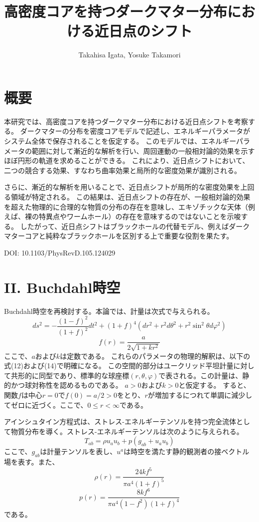 \documentclass[dvipdfmx]{report} %
\title{高密度コアを持つダークマター分布における近日点のシフト}
\author{Takahisa Igata, Yosuke Takamori}
\date{}
\begin{document}
\maketitle %

\section*{概要}
本研究では、高密度コアを持つダークマター分布における近日点シフトを考察する。
ダークマターの分布を密度コアモデルで記述し、エネルギーパラメータがシステム全体で保存されることを仮定する。
このモデルでは、エネルギーパラメータの範囲に対して漸近的な解析を行い、周回運動の一般相対論的効果を示すほぼ円形の軌道を求めることができる。
これにより、近日点シフトにおいて、二つの競合する効果、すなわち曲率効果と局所的な密度効果が識別される。

さらに、漸近的な解析を用いることで、近日点シフトが局所的な密度効果を上回る領域が特定される。
この結果は、近日点シフトの存在が、一般相対論的効果を超えた物理的に合理的な物質の分布の存在を意味し、エキゾチックな天体（例えば、裸の特異点やワームホール）の存在を意味するのではないことを示唆する。
したがって、近日点シフトはブラックホールの代替モデル、例えばダークマターコアと純粋なブラックホールを区別する上で重要な役割を果たす。

DOI: 10.1103/PhysRevD.105.124029

\section*{II. Buchdahl時空}
Buchdahl時空を再検討する。本論では、計量は次式で与えられる。
\begin{equation}
    ds^2 = -\frac{(1-f)^2}{(1+f)^2} dt^2 + (1+f)^4 (dr^2 + r^2 d\theta^2 + r^2 \sin^2 \theta d\varphi^2)
\end{equation}
\begin{equation}
    f(r) = \frac{a}{2\sqrt{1 + kr^2}}
\end{equation}
ここで、$a$および$k$は定数である。
これらのパラメータの物理的解釈は、以下の式(12)および(14)で明確になる。
この空間的部分はユークリッド平坦計量に対して共形的に同型であり、標準的な球座標$(r, \theta, \varphi)$で表される。この計量は、静的かつ球対称性を認めるものである。
$a > 0$および$k > 0$と仮定する。
すると、関数$f$は中心$r = 0$で$f(0) = a/2 > 0$をとり、$r$が増加するにつれて単調に減少してゼロに近づく。ここで、$0 \leq r < \infty$である。

アインシュタイン方程式は、ストレス-エネルギーテンソルを持つ完全流体として物質分布を導く。ストレス-エネルギーテンソルは次のように与えられる。
\begin{equation}
    T_{ab} = \rho u_a u_b + p (g_{ab} + u_a u_b)
\end{equation}
ここで、$g_{ab}$は計量テンソルを表し、$u^a$は時空を満たす静的観測者の接ベクトル場を表す。また、
\begin{equation}
    \rho(r) = \frac{24k f^5}{\pi a^4 (1 + f)^5}
\end{equation}
\begin{equation}
    p(r) = \frac{8k f^6}{\pi a^4 (1 - f^2)(1 + f)^4}
\end{equation}
である。
\end{document}
